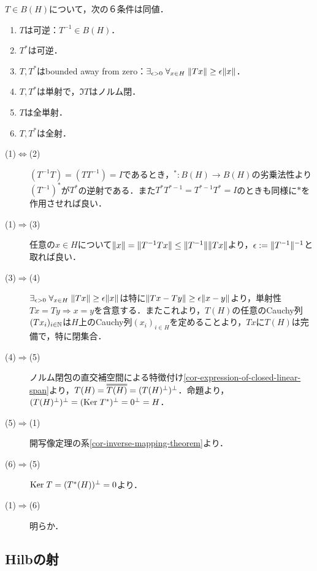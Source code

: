 \documentclass[uplatex,dvipdfmx]{jsreport}
\begin{document}
\begin{proposition}\label{prop-characterization-of-invertibleness-of-operator}
    $T\in B(H)$について，次の６条件は同値．
    \begin{enumerate}
        \item $T$は可逆：$T^{-1}\in B(H)$．
        \item $T^*$は可逆．
        \item $T,T^*$はbounded away from zero：$\exists_{\epsilon>0}\;\forall_{x\in H}\;\|Tx\|\ge\epsilon\|x\|$．%
        \item $T,T^*$は単射で，$\Im T$はノルム閉．
        \item $T$は全単射．
        \item $T,T^*$は全射．
    \end{enumerate}
\end{proposition}
\begin{Proof}\mbox{}
    \begin{description}
        \item[(1)$\Leftrightarrow$(2)] $(T^{-1}T)=(TT^{-1})=I$であるとき，${}^*:B(H)\to B(H)$の劣乗法性より$(T^{-1})^*$が$T^*$の逆射である．また$T^*T^{*-1}=T^{*-1}T^*=I$のときも同様に$*$を作用させれば良い．
        \item[(1)$\Rightarrow$(3)] 任意の$x\in H$について$\|x\|=\|T^{-1}Tx\|\le\|T^{-1}\|\|Tx\|$より，$\epsilon:=\|T^{-1}\|^{-1}$と取れば良い．
        \item[(3)$\Rightarrow$(4)] $\exists_{\epsilon>0}\;\forall_{x\in H}\;\|Tx\|\ge\epsilon\|x\|$は特に$\|Tx-Ty\|\ge\epsilon\|x-y\|$より，単射性$Tx=Ty\Rightarrow x=y$を含意する．またこれより，$T(H)$の任意のCauchy列$(Tx_i)_{i\in\mathbb{N}}$は$H$上のCauchy列$(x_i)_{i\in H}$を定めることより，$Tx$に$T(H)$は完備で，特に閉集合．
        \item[(4)$\Rightarrow$(5)] ノルム閉包の直交補空間による特徴付け\ref{cor-expression-of-closed-linear-span}より，$T(H)=\dbloverline{T(H)}=(T(H)^\perp)^\perp$．命題より，$(T(H)^\perp)^\perp=(\mathrm{Ker}\; T^*)^\perp=0^\perp=H$．
        \item[(5)$\Rightarrow$(1)] 開写像定理の系\ref{cor-inverse-mapping-theorem}より．
        \item[(6)$\Rightarrow$(5)] $\mathrm{Ker}\; T=(T^*(H))^\perp=0$より．
        \item[(1)$\Rightarrow$(6)] 明らか．
    \end{description}
\end{Proof}

\subsection{Hilbの射}
\end{document}

